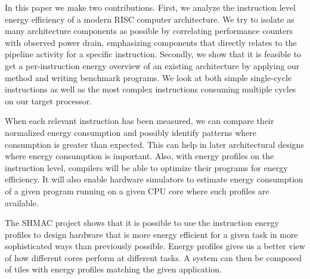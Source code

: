 In this paper we make two contributions. First, we analyze the instruction level
energy efficiency of a modern RISC computer architecture. We try to isolate as
many architecture components as possible by correlating performance counters
with observed power drain, emphasizing components that directly relates to the
pipeline activity for a specific instruction. Secondly, we show that it is
feasible to get a per-instruction energy overview of an existing architecture by
applying our method and writing benchmark programs. We look at both simple
single-cycle instructions as well as the most complex instructions consuming
multiple cycles on our target processor.

When each relevant instruction has been measured, we can compare their
normalized energy consumption and possibly identify patterns where consumption
is greater than expected. This can help in later architectural designs where
energy consumption is important. Also, with energy profiles on the instruction
level, compilers will be able to optimize their programs for energy efficiency.
It will also enable hardware simulators to estimate energy consumption of
a given program running on a given CPU core where such profiles are available.

The SHMAC project shows that it is possible to use the instruction energy
profiles to design hardware that is more energy efficient for a given task in
more sophisticated ways than previously possible. Energy profiles gives us a
better view of how different cores perform at different
tasks\cite{kumar2003single}. A system can then be composed of tiles with energy
profiles matching the given application.



